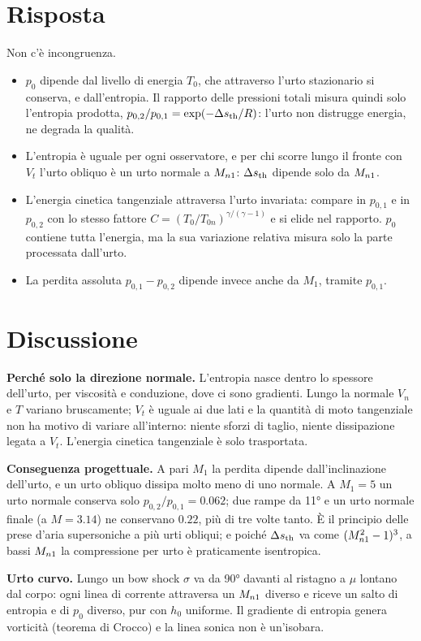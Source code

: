\section*{Risposta}
Non c'è incongruenza.
\begin{itemize}
  \item $p_0$ dipende dal livello di energia $T_0$, che attraverso l'urto stazionario si conserva, e
    dall'entropia. Il rapporto delle pressioni totali misura quindi solo l'entropia prodotta,
    $p_{0,2}/p_{0,1}=\exp(-\Delta s_{\rm th}/R)$: l'urto non distrugge energia, ne degrada la qualità.
  \item L'entropia è uguale per ogni osservatore, e per chi scorre lungo il fronte con $V_t$ l'urto obliquo è un
    urto normale a $M_{n1}$: $\Delta s_{\rm th}$ dipende solo da $M_{n1}$.
  \item L'energia cinetica tangenziale attraversa l'urto invariata: compare in $p_{0,1}$ e in $p_{0,2}$ con lo
    stesso fattore $C=(T_0/T_{0n})^{\gamma/(\gamma-1)}$ e si elide nel rapporto. $p_0$ contiene tutta l'energia,
    ma la sua variazione relativa misura solo la parte processata dall'urto.
  \item La perdita assoluta $p_{0,1}-p_{0,2}$ dipende invece anche da $M_1$, tramite $p_{0,1}$.
\end{itemize}

\section*{Discussione}
\textbf{Perché solo la direzione normale.} L'entropia nasce dentro lo spessore dell'urto, per viscosità e
conduzione, dove ci sono gradienti. Lungo la normale $V_n$ e $T$ variano bruscamente; $V_t$ è uguale ai due lati e
la quantità di moto tangenziale non ha motivo di variare all'interno: niente sforzi di taglio, niente dissipazione
legata a $V_t$. L'energia cinetica tangenziale è solo trasportata.

\textbf{Conseguenza progettuale.} A pari $M_1$ la perdita dipende dall'inclinazione dell'urto, e un urto obliquo
dissipa molto meno di uno normale. A $M_1=5$ un urto normale conserva solo $p_{0,2}/p_{0,1}=\num{0.062}$; due rampe da
\ang{11} e un urto normale finale (a $M=\num{3.14}$) ne conservano $\num{0.22}$, più di tre volte tanto. È il principio
delle prese d'aria supersoniche a più urti obliqui; e poiché $\Delta s_{\rm th}$ va come $(M_{n1}^2-1)^3$, a bassi $M_{n1}$ la
compressione per urto è praticamente isentropica.

\textbf{Urto curvo.} Lungo un bow shock $\sigma$ va da \ang{90} davanti al ristagno a $\mu$ lontano dal corpo: ogni
linea di corrente attraversa un $M_{n1}$ diverso e riceve un salto di entropia e di $p_0$ diverso, pur con $h_0$
uniforme. Il gradiente di entropia genera vorticità (teorema di Crocco) e la linea sonica non è un'isobara.

